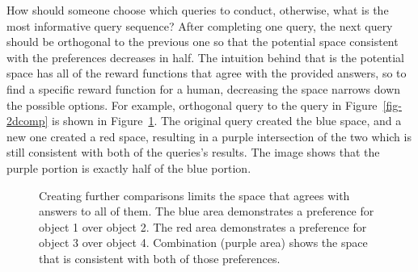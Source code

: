 \documentclass[
  letterpaper,
  numbers=noenddot,
  DIV=11]{scrreprt}
\theoremstyle{definition}
\theoremstyle{plain}
\theoremstyle{plain}
\theoremstyle{remark}
\begin{document}
How should someone choose which queries to conduct, otherwise, what is
the most informative query sequence? After completing one query, the
next query should be orthogonal to the previous one so that the
potential space consistent with the preferences decreases in half. The
intuition behind that is the potential space has all of the reward
functions that agree with the provided answers, so to find a specific
reward function for a human, decreasing the space narrows down the
possible options. For example, orthogonal query to the query in
Figure~\ref{fig-2dcomp} is shown in Figure~\ref{fig-2dspace}. The
original query created the blue space, and a new one created a red
space, resulting in a purple intersection of the two which is still
consistent with both of the queries's results. The image shows that the
purple portion is exactly half of the blue portion.

\begin{figure}


\caption{\label{fig-2dspace}Creating further comparisons limits the
space that agrees with answers to all of them. The blue area
demonstrates a preference for object 1 over object 2. The red area
demonstrates a preference for object 3 over object 4. Combination
(purple area) shows the space that is consistent with both of those
preferences.}

\end{figure}%
\end{document}
